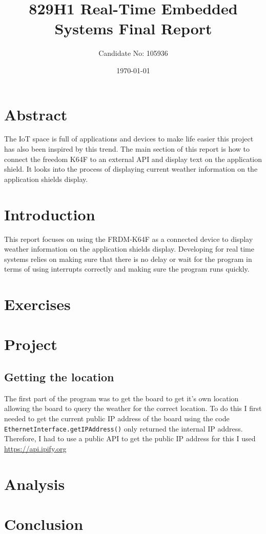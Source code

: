 \documentclass[a4paper,12pt]{scrartcl}
\title{829H1 Real-Time Embedded Systems Final Report}
\author{Candidate No: 105936}
\date{\today}
\begin{document}
	
	\begin{titlepage}
		\maketitle
	\end{titlepage}
	
	\tableofcontents
	\newpage

	\section{Abstract}
	{
		The IoT space is full of applications and devices to make life easier this project has also been inspired by this trend. The main section of this report is how to connect the freedom K64F\cite{nxpproducts2014} to an external API and display text on the application shield. It looks into the process of displaying current weather information on the application shields display.
	}

	\section{Introduction}
	{
		This report focuses on using the FRDM-K64F\cite{nxpproducts2014} as a connected device to display weather information on the application shields display. Developing for real time systems relies on making sure that there is no delay or wait for the program in terms of using interrupts correctly and making sure the program runs quickly.
	}
	
	\section{Exercises}
	{
	}

	\section{Project}
	{
		\subsection{Getting the location}
		{
			The first part of the program was to get the board to get it's own location allowing the board to query the weather for the correct location. To do this I first needed to get the current public IP address of the board using the code \lstinline|EthernetInterface.getIPAddress()| only returned the internal IP address. Therefore, I had to use a public API to get the public IP address for this I used \url{https://api.ipify.org}\cite{Degges} 
		}
	}
	
	\section{Analysis}
	{
	
	}
	
	\section{Conclusion}
	{
		
	}
	
	\newpage
	
	\printbibliography[heading=bibintoc,title=References]
\end{document}
